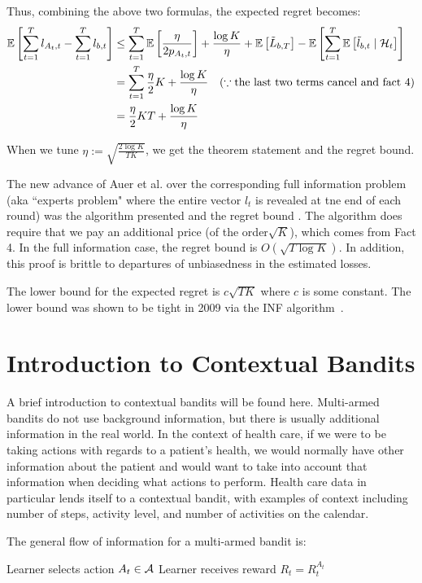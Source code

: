 \documentclass[11pt]{article}
\begin{document}
Thus, combining the above two formulas, the expected regret becomes:
\begin{align*}
\mathbb{E}\left[ \sum_{t=1}^T l_{A_t, t} - \sum_{t=1}^T l_{b,t} \right] &\leq \sum_{t=1}^T \mathbb{E}\left[ \frac{\eta}{2p_{A_t, t}} \right] + \frac{\log K}{\eta} +\mathbb{E}\left[ \tilde L_{b,T} \right] -\mathbb{E}\left[ \sum_{t=1}^T \mathbb{E}\left[ \tilde l_{b,t} \mid \mathcal{H}_t \right] \right]\\
& = \sum_{t=1}^T \frac{\eta}{2} K + \frac{\log K}{\eta} ~~~ (\because \text{the last two terms cancel and fact 4})\\
&=\frac{\eta}{2} KT + \frac{\log K}{\eta}
\end{align*}

When we tune $\eta := \sqrt{\frac{2 \log K}{TK}}$, we get the theorem statement and the regret bound.

The new advance of Auer et al. over the corresponding full information problem (aka ``experts problem" where the entire vector $l_t$ is revealed at tne end of each round) was the algorithm presented and the regret bound \cite{auer2002nonstochastic}.  The algorithm does require that we pay an additional price (of the order$\sqrt{K}$), which comes from Fact 4.  In the full information case, the regret bound is $O(\sqrt{T \log K})$.  In addition, this proof is brittle to departures of unbiasedness in the estimated losses.

The lower bound for the expected regret is $c\sqrt{TK}$ where $c$ is some constant.  The lower bound was shown to be tight in 2009 via the INF algorithm~\cite{audibert2009minimax}.

\section{Introduction to Contextual Bandits}

A brief introduction to contextual bandits will be found here.  Multi-armed bandits do not use background information, but there is usually additional information in the real world.  In the context of health care, if we were to be taking actions with regards to a patient's health, we would normally have other information about the patient and would want to take into account that information when deciding what actions to perform.  Health care data in particular lends itself to a contextual bandit, with examples of context including number of steps, activity level, and number of activities on the calendar.

The general flow of information for a multi-armed bandit is:

\begin{algorithmic}[1]
\STATE Learner selects action $A_t \in \mathcal{A}$
\STATE Learner receives reward $R_t = R^{A_t}_t$
\ENDFOR
\end{algorithmic}
\end{document}
